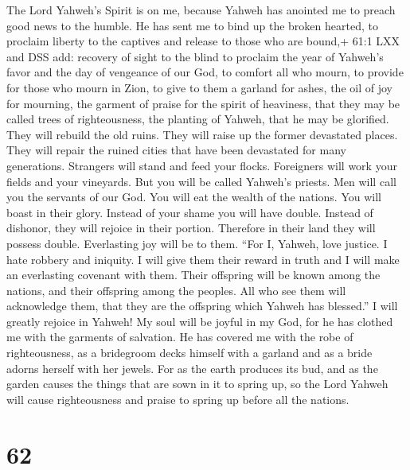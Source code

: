  The Lord Yahweh's Spirit is on me, because Yahweh has
anointed me to preach good news to the humble. He has sent me to bind up
the broken hearted, to proclaim liberty to the captives and release to
those who are bound,+ 61:1 LXX and DSS add: recovery of sight to the
blind  to proclaim the year of Yahweh's favor and the day of
vengeance of our God, to comfort all who mourn,  to provide
for those who mourn in Zion, to give to them a garland for ashes, the
oil of joy for mourning, the garment of praise for the spirit of
heaviness, that they may be called trees of righteousness, the planting
of Yahweh, that he may be glorified.  They will rebuild the
old ruins. They will raise up the former devastated places. They will
repair the ruined cities that have been devastated for many generations.
 Strangers will stand and feed your flocks. Foreigners will
work your fields and your vineyards.  But you will be called
Yahweh's priests. Men will call you the servants of our God. You will
eat the wealth of the nations. You will boast in their glory.
 Instead of your shame you will have double. Instead of
dishonor, they will rejoice in their portion. Therefore in their land
they will possess double. Everlasting joy will be to them. 
``For I, Yahweh, love justice. I hate robbery and iniquity. I will give
them their reward in truth and I will make an everlasting covenant with
them.  Their offspring will be known among the nations, and
their offspring among the peoples. All who see them will acknowledge
them, that they are the offspring which Yahweh has blessed.''
 I will greatly rejoice in Yahweh! My soul will be joyful
in my God, for he has clothed me with the garments of salvation. He has
covered me with the robe of righteousness, as a bridegroom decks himself
with a garland and as a bride adorns herself with her jewels.
 For as the earth produces its bud, and as the garden
causes the things that are sown in it to spring up, so the Lord Yahweh
will cause righteousness and praise to spring up before all the nations.

\hypertarget{section-58}{%
\section{62}\label{section-58}}

